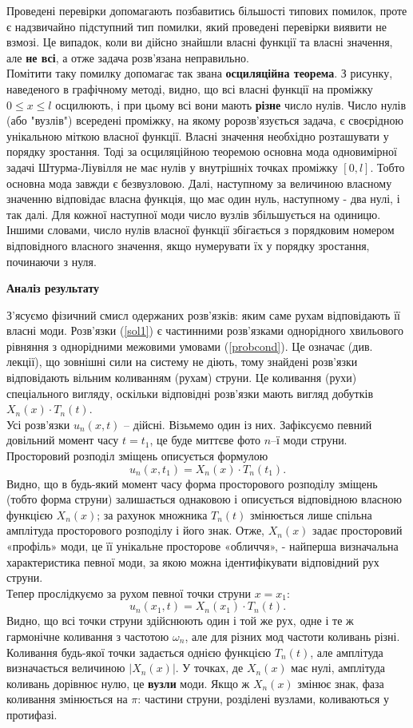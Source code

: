 Проведені перевірки допомагають позбавитись більшості типових помилок, проте є надзвичайно підступний тип помилки, який проведені перевірки виявити не взмозі. Це випадок, коли ви дійсно знайшли власні функції та власні значення, але \textbf{не всі}, а отже задача розв'язана неправильно.\\
Помітити таку помилку допомагає так звана \textbf{осциляційна теорема}. З рисунку, наведеного в графічному методі, видно, що всі власні функції на проміжку $0 \leq x \leq l$ осцилюють, і при цьому всі вони мають \textbf{різне} число нулів. Число нулів (або "вузлів") всередені проміжку, на якому ророзв’язується задача, є своєрідною унікальною міткою власної функції. Власні значення необхідно розташувати у порядку зростання. Тоді за осциляційною теоремою основна мода одновимірної задачі Штурма-Ліувілля не має нулів у внутрішніх точках проміжку $[0, l]$. Тобто основна мода завжди є безвузловою. Далі, наступному за величиною власному значенню відповідає власна функція, що має один нуль, наступному - два нулі, і так далі. Для кожної наступної моди число вузлів збільшується на одиницю. Іншими словами, число нулів власної функції збігається з порядковим номером відповідного власного значення, якщо нумерувати їх у порядку зростання, починаючи з нуля.

\begin{center}
    \large{\textbf{Аналіз результату}}
\end{center}
З'ясуємо фізичний смисл одержаних розв'язків: яким саме рухам відповідають її власні моди. Розв’язки (\ref{sol1}) є частинними розв'язками однорідного хвильового рівняння з однорідними межовими умовами (\ref{probcond}). Це означає (див. лекції), що зовнішні сили на систему не діють, тому знайдені розв’язки відповідають вільним коливанням (рухам) струни. Це коливання (рухи) спеціального вигляду, оскільки відповідні розв’язки мають вигляд добутків $X_n(x) \cdot T_n(t)$.\\
Усі розв’язки $u_n(x, t)$ -- дійсні. Візьмемо один із них. Зафіксуємо певний довільний момент часу $t = t_1$, це буде миттєве фото $n$–ї моди струни. Просторовий розподіл зміщень описується формулою \[u_n(x, t_1) = X_n(x) \cdot T_n(t_1).\] Видно, що в будь-який момент часу форма просторового розподілу зміщень (тобто форма струни) залишається однаковою і описується відповідною власною функцією $X_n(x)$; за рахунок множника $T_n(t)$ змінюється лише спільна амплітуда просторового розподілу і його знак. Отже, $X_n(x)$ задає просторовий «профіль» моди, це її унікальне просторове «обличчя», - найперша визначальна характеристика певної моди, за якою можна ідентифікувати відповідний рух струни.\\
Тепер прослідкуємо за рухом певної точки струни $x = x_1$: \[u_n(x_1, t) = X_n(x_1) \cdot T_n(t).\] Видно, що всі точки струни здійснюють один і той же рух, одне і те ж гармонічне коливання з частотою $\omega_n$, але для різних мод частоти коливань різні. Коливання будь-якої точки задається однією функцією $T_n(t)$, але амплітуда визначається величиною $\left|X_n(x)\right|$. У точках, де $X_n(x)$ має нулі, амплітуда коливань дорівнює нулю, це \textbf{вузли} моди. Якщо ж $X_n(x)$ змінює знак, фаза коливання змінюється на $\pi$: частини струни, розділені вузлами, коливаються у протифазі.

